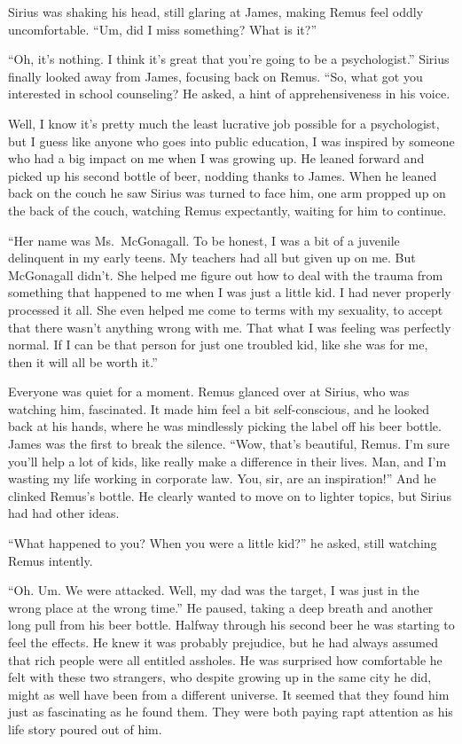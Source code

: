 \documentclass[12pt,twoside,openright]{memoir}
\begin{document}
Sirius was shaking his head, still glaring at James, making Remus feel oddly uncomfortable. ``Um, did I miss something?
What is it?''

``Oh, it's nothing. I think it's great that you're going to be a psychologist.'' Sirius finally looked away from James, focusing back on Remus. ``So, what got you interested in school counseling?{\textquotedbl} He asked, a hint of apprehensiveness in his voice.

{\textquotedbl}Well, I know it's pretty much the least lucrative job possible for a psychologist, but I guess like anyone who goes into public education, I was inspired by someone who had a big impact on me when I was growing up.{\textquotedbl} He leaned forward and picked up his second bottle of beer, nodding thanks to James. When he leaned back on the couch he saw Sirius was turned to face him, one arm propped up on the back of the couch, watching Remus expectantly, waiting for him to continue.

``Her name was Ms.\ McGonagall. To be honest, I was a bit of a juvenile delinquent in my early teens. My teachers had all but given up on me. But McGonagall didn't. She helped me figure out how to deal with the trauma from something that happened to me when I was just a little kid. I had never properly processed it all. She even helped me come to terms with my sexuality, to accept that there wasn't anything wrong with me. That what I was feeling was perfectly normal. If I can be that person for just one troubled kid, like she was for me, then it will all be worth it.''

Everyone was quiet for a moment. Remus glanced over at Sirius, who was watching him, fascinated. It made him feel a bit self-conscious, and he looked back at his hands, where he was mindlessly picking the label off his beer bottle. James was the first to break the silence. ``Wow, that's beautiful, Remus. I'm sure you'll help a lot of kids, like really make a difference in their lives. Man, and I'm wasting my life working in corporate law. You, sir, are an inspiration!'' And he clinked Remus's bottle. He clearly wanted to move on to lighter topics, but Sirius had had other ideas.

``What happened to you? When you were a little kid?'' he asked, still watching Remus intently.

``Oh. Um. We were attacked. Well, my dad was the target, I was just in the wrong place at the wrong time.'' He paused, taking a deep breath and another long pull from his beer bottle. Halfway through his second beer he was starting to feel the effects. He knew it was probably prejudice, but he had always assumed that rich people were all entitled assholes. He was surprised how comfortable he felt with these two strangers, who despite growing up in the same city he did, might as well have been from a different universe. It seemed that they found him just as fascinating as he found them. They were both paying rapt attention as his life story poured out of him.
\end{document}
